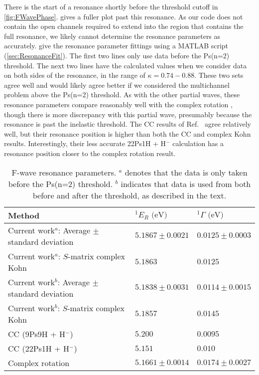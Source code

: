 \documentclass[Dissertation.tex]{subfiles}
\begin{document}
There is the start of a resonance shortly before the threshold cutoff in 
\cref{fig:FWavePhase}.  gives a fuller
plot past this resonance. As our code does not contain the open channels 
required to extend into the region that contains the full resonance, 
we likely cannot determine the resonance parameters as accurately.
 give the resonance 
parameter fittings using a MATLAB script (\cref{sec:ResonanceFit}).
The first two lines only use data before the Ps(n=2) threshold. The next
two lines have the calculated values when we consider data on both sides of the
resonance, in the range of $\kappa = 0.74 - 0.88$. These two sets
agree well and would likely agree better if we considered the multichannel
problem above the Ps(n=2) threshold.
As with the other partial
waves, these resonance parameters compare reasonably well with the complex
rotation \cite{Ho2000}, though there is more discrepancy with this partial
wave, presumably because the resonance is past the inelastic threshold.
The CC results of Ref.~\cite{Walters2004} agree relatively well, but their
resonance position is higher than both the CC and complex Kohn results.
Interestingly, their less accurate 22Ps1H + H$^-$ calculation
\cite{Blackwood2002b} has a resonance position closer to the complex rotation
result.

\setlength{\abovecaptionskip}{6pt}   %
\setlength{\belowcaptionskip}{6pt}   %
\begin{table}
\centering
\begin{tabular}{l l l}
\toprule
Method & $^1E_R \text{ (eV)}$ & $^1\Gamma \text{ (eV)}$ \\
\midrule
Current work$^a$: Average $\pm$ standard deviation & $5.1867 \pm 0.0021$ & $0.0125 \pm 0.0003$ \\
Current work$^a$: $S$-matrix complex Kohn & $5.1863$ & $0.0125$ \\
Current work$^b$: Average $\pm$ standard deviation & $5.1838 \pm 0.0031$ & $0.0114 \pm 0.0015$ \\
Current work$^b$: $S$-matrix complex Kohn & $5.1857$ & $0.0145$ \\
CC (9Ps9H + H$^-$) \cite{Walters2004} & $5.200$ & $0.0095$ \\
CC (22Ps1H + H$^-$) \cite{Blackwood2002b} & $5.151$ & $0.010$ \\
Complex rotation \cite{Ho2000} & $5.1661 \pm 0.0014$ & $0.0174 \pm 0.0027$  \\
\bottomrule
\end{tabular}
\caption[F-wave resonance parameters]{F-wave resonance parameters. $^a$ denotes that the data is only taken before the Ps(n=2) threshold.
$^b$ indicates that data is used from both before and after the threshold, as described in the text.}
\label{tab:FWaveResonanceComparisons}
\end{table}
\end{document}
